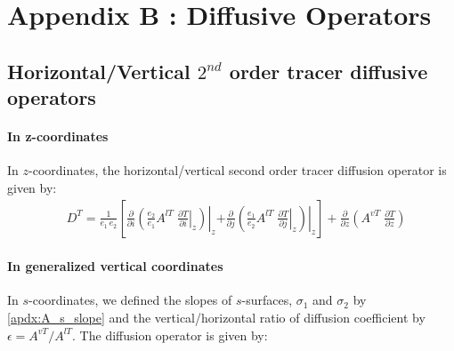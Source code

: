 \documentclass[../main/NEMO_manual]{subfiles}
\begin{document}
\chapter{Appendix B : Diffusive Operators}
\label{apdx:B}

\minitoc

\newpage

\section{Horizontal/Vertical $2^{nd}$ order tracer diffusive operators}
\label{sec:B_1}

\subsubsection*{In z-coordinates}

In $z$-coordinates, the horizontal/vertical second order tracer diffusion operator is given by:
\begin{align}
  \label{apdx:B1}
  &D^T = \frac{1}{e_1 \, e_2}      \left[
    \left. \frac{\partial}{\partial i} \left( 	\frac{e_2}{e_1}A^{lT} \;\left. \frac{\partial T}{\partial i} \right|_z   \right)   \right|_z      \right.
    \left.
    + \left. \frac{\partial}{\partial j} \left(  \frac{e_1}{e_2}A^{lT} \;\left. \frac{\partial T}{\partial j} \right|_z   \right)   \right|_z      \right]
    + \frac{\partial }{\partial z}\left( {A^{vT} \;\frac{\partial T}{\partial z}} \right)
\end{align}

\subsubsection*{In generalized vertical coordinates}

In $s$-coordinates, we defined the slopes of $s$-surfaces, $\sigma_1$ and $\sigma_2$ by \autoref{apdx:A_s_slope} and
the vertical/horizontal ratio of diffusion coefficient by $\epsilon = A^{vT} / A^{lT}$.
The diffusion operator is given by:
\end{document}
